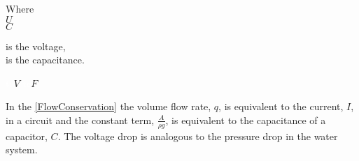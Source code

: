 \begin{minipage}[t]{0.20\textwidth}
Where\\
\hspace*{8mm} $U$ \\
\hspace*{8mm} $C$ 
\end{minipage}
\begin{minipage}[t]{0.68\textwidth}
\vspace*{2mm}
is the voltage,\\
is the capacitance.
\end{minipage}
\begin{minipage}[t]{0.10\textwidth}
\vspace*{2mm}
\textcolor{White}{te}$\unit{V}$
\textcolor{White}{te}$\unit{F}$
\end{minipage}

In the \eqref{FlowConservation} the volume flow rate, $q$, is equivalent to the current, $I$, in a circuit and the constant term, $\frac{A}{\rho g}$, is equivalent to the capacitance of a capacitor, $C$. The voltage drop is analogous to the pressure drop in the water system.




